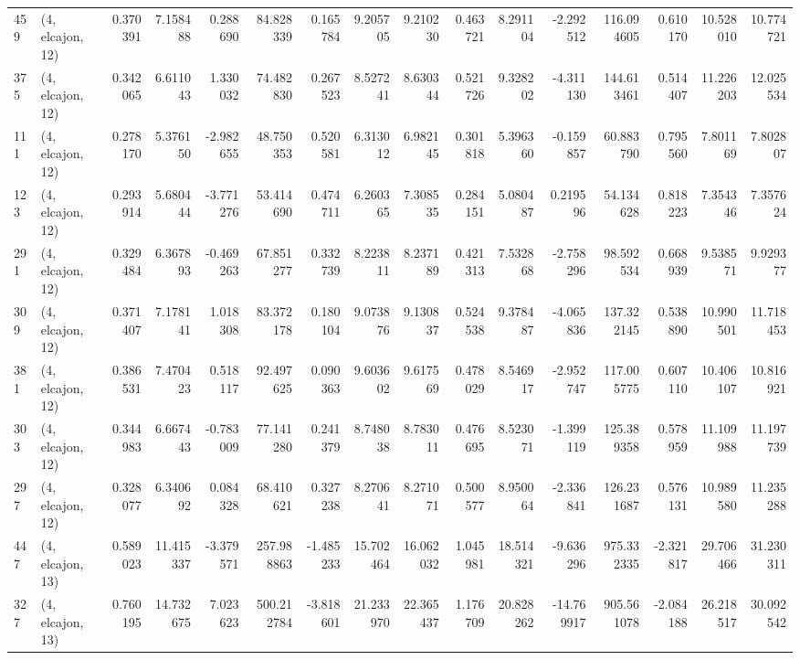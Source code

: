 \begin{tabular}{llrrrrrrrrrrrrrr}
459 &  (4, elcajon, 12) &   0.370391 &   7.158488 &   0.288690 &    84.828339 &   0.165784 &   9.205705 &   9.210230 &  0.463721 &   8.291104 &  -2.292512 &   116.094605 &  0.610170 &  10.528010 &  10.774721 \\
375 &  (4, elcajon, 12) &   0.342065 &   6.611043 &   1.330032 &    74.482830 &   0.267523 &   8.527241 &   8.630344 &  0.521726 &   9.328202 &  -4.311130 &   144.613461 &  0.514407 &  11.226203 &  12.025534 \\
111 &  (4, elcajon, 12) &   0.278170 &   5.376150 &  -2.982655 &    48.750353 &   0.520581 &   6.313012 &   6.982145 &  0.301818 &   5.396360 &  -0.159857 &    60.883790 &  0.795560 &   7.801169 &   7.802807 \\
123 &  (4, elcajon, 12) &   0.293914 &   5.680444 &  -3.771276 &    53.414690 &   0.474711 &   6.260365 &   7.308535 &  0.284151 &   5.080487 &   0.219596 &    54.134628 &  0.818223 &   7.354346 &   7.357624 \\
291 &  (4, elcajon, 12) &   0.329484 &   6.367893 &  -0.469263 &    67.851277 &   0.332739 &   8.223811 &   8.237189 &  0.421313 &   7.532868 &  -2.758296 &    98.592534 &  0.668939 &   9.538571 &   9.929377 \\
309 &  (4, elcajon, 12) &   0.371407 &   7.178141 &   1.018308 &    83.372178 &   0.180104 &   9.073876 &   9.130837 &  0.524538 &   9.378487 &  -4.065836 &   137.322145 &  0.538890 &  10.990501 &  11.718453 \\
381 &  (4, elcajon, 12) &   0.386531 &   7.470423 &   0.518117 &    92.497625 &   0.090363 &   9.603602 &   9.617569 &  0.478029 &   8.546917 &  -2.952747 &   117.005775 &  0.607110 &  10.406107 &  10.816921 \\
303 &  (4, elcajon, 12) &   0.344983 &   6.667443 &  -0.783009 &    77.141280 &   0.241379 &   8.748038 &   8.783011 &  0.476695 &   8.523071 &  -1.399119 &   125.389358 &  0.578959 &  11.109988 &  11.197739 \\
297 &  (4, elcajon, 12) &   0.328077 &   6.340692 &   0.084328 &    68.410621 &   0.327238 &   8.270641 &   8.271071 &  0.500577 &   8.950064 &  -2.336841 &   126.231687 &  0.576131 &  10.989580 &  11.235288 \\
447 &  (4, elcajon, 13) &   0.589023 &  11.415337 &  -3.379571 &   257.988863 &  -1.485233 &  15.702464 &  16.062032 &  1.045981 &  18.514321 &  -9.636296 &   975.332335 & -2.321817 &  29.706466 &  31.230311 \\
327 &  (4, elcajon, 13) &   0.760195 &  14.732675 &   7.023623 &   500.212784 &  -3.818601 &  21.233970 &  22.365437 &  1.176709 &  20.828262 & -14.769917 &   905.561078 & -2.084188 &  26.218517 &  30.092542 \\

\end{tabular}
